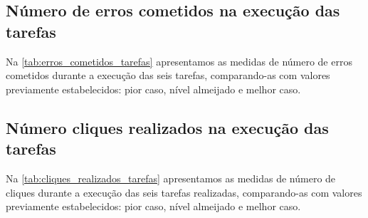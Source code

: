 \subsection{Número de erros cometidos na execução das tarefas}
Na \autoref{tab:erros_cometidos_tarefas} apresentamos as medidas de número de erros cometidos durante a execução das seis tarefas, comparando-as com valores previamente estabelecidos: pior caso, nível almeijado e melhor caso. 

\begin{table}[H]
\end{table}

\subsection{Número cliques realizados na execução das tarefas}
Na \autoref{tab:cliques_realizados_tarefas} apresentamos as medidas de número de cliques durante a execução das seis tarefas realizadas, comparando-as com valores previamente estabelecidos: pior caso, nível almeijado e melhor caso. 

